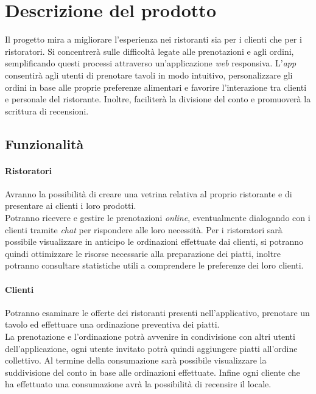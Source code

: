\section{Descrizione del prodotto}
Il progetto mira a migliorare l'esperienza nei ristoranti sia per i clienti che per i ristoratori. 
Si concentrerà sulle difficoltà legate alle prenotazioni e agli ordini, semplificando questi processi attraverso un'applicazione \textit{web} responsiva. 
L'\textit{app} consentirà agli utenti di prenotare tavoli in modo intuitivo, personalizzare gli ordini in base alle proprie preferenze alimentari e favorire l'interazione tra clienti e personale del ristorante. 
Inoltre, faciliterà la divisione del conto e promuoverà la scrittura di recensioni.

\subsection{Funzionalità}
\paragraph*{Ristoratori} Avranno la possibilità di creare una vetrina relativa al proprio ristorante e di presentare ai clienti i loro prodotti.\\
Potranno ricevere e gestire le prenotazioni \textit{online}, eventualmente dialogando con i clienti tramite \textit{chat} per rispondere alle loro necessità.
Per i ristoratori sarà possibile visualizzare in anticipo le ordinazioni effettuate dai clienti, si potranno quindi ottimizzare le risorse necessarie alla preparazione dei piatti, inoltre potranno consultare statistiche utili a comprendere le preferenze dei loro clienti.
\paragraph*{Clienti} Potranno esaminare le offerte dei ristoranti presenti nell'applicativo, prenotare un tavolo ed effettuare una ordinazione preventiva dei piatti.\\
La prenotazione e l'ordinazione potrà avvenire in condivisione con altri utenti dell'applicazione, ogni utente invitato potrà quindi aggiungere piatti all'ordine collettivo. 
Al termine della consumazione sarà possibile visualizzare la suddivisione del conto in base alle ordinazioni effettuate.
Infine ogni cliente che ha effettuato una consumazione avrà la possibilità di recensire il locale.


